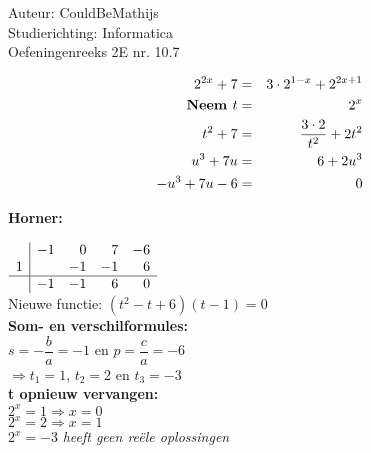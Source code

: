 \documentclass[a4paper]{article}
\begin{document}
  
\noindent \large Auteur: CouldBeMathijs \\
\noindent \large Studierichting: Informatica\\
\noindent \large Oefeningenreeks 2E nr. 10.7\\

\medskip

\normalsize

\begin{eqnarray*}
    2^{2x} + 7 &=& 3 \cdot 2^{1-x} + 2^{2x+1} \\
    \text{\textbf{Neem }} t & = &2^x\\
    t^2 + 7 & = & \dfrac{3 \cdot 2}{t^2} + 2t^2\\
    u^3 + 7u & = & 6 + 2u^3\\
    -u^3 + 7u -6 & = & 0
\end{eqnarray*}

\textbf{Horner:\\}

$\begin{array}{r|r r r r}
    & -1 & 0 & 7 & -6\\
   1&    &-1 &-1 &  6\\ \hline
    & -1 & -1& 6 & 0
\end{array}$ \\

Nieuwe functie: $(t^2-t+6)(t-1) = 0$\\

\textbf{Som- en verschilformules:}\\

$s= -\dfrac{b}{a} = -1$ en $p = \dfrac{c}{a} = -6$\\

$\Rightarrow t_1 = 1$, $t_2 = 2$ en $t_3 = -3$\\

\textbf{t opnieuw vervangen:}\\

$2^x = 1 \Rightarrow x = 0$\\

$2^x = 2 \Rightarrow x = 1$\\

$2^x = -3$ \textit{heeft geen reële oplossingen}




\begin{thebibliography}{999}
\end{thebibliography}
\end{document}
